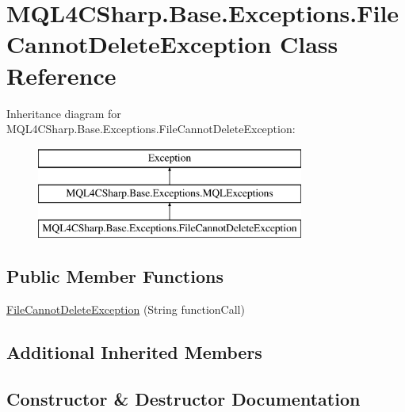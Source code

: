 \hypertarget{class_m_q_l4_c_sharp_1_1_base_1_1_exceptions_1_1_file_cannot_delete_exception}{}\section{M\+Q\+L4\+C\+Sharp.\+Base.\+Exceptions.\+File\+Cannot\+Delete\+Exception Class Reference}
\label{class_m_q_l4_c_sharp_1_1_base_1_1_exceptions_1_1_file_cannot_delete_exception}
Inheritance diagram for M\+Q\+L4\+C\+Sharp.\+Base.\+Exceptions.\+File\+Cannot\+Delete\+Exception\+:\begin{figure}[H]
\begin{center}
\leavevmode
\includegraphics[height=3.000000cm]{class_m_q_l4_c_sharp_1_1_base_1_1_exceptions_1_1_file_cannot_delete_exception}
\end{center}
\end{figure}
\subsection*{Public Member Functions}
\begin{DoxyCompactItemize}
\item 
\hyperlink{class_m_q_l4_c_sharp_1_1_base_1_1_exceptions_1_1_file_cannot_delete_exception_a3c7600ebc23487e85de8f52f3b9e56fd}{File\+Cannot\+Delete\+Exception} (String function\+Call)
\end{DoxyCompactItemize}
\subsection*{Additional Inherited Members}


\subsection{Constructor \& Destructor Documentation}
